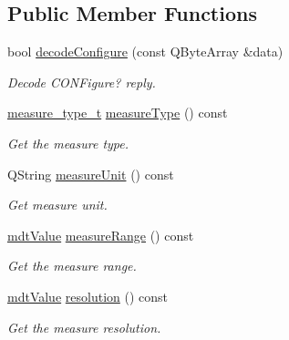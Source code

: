 \subsection*{Public Member Functions}
\begin{DoxyCompactItemize}
\item 
bool \hyperlink{classmdt_frame_codec_scpi_u3606_a_a178cc4f868b15b8c4591d8333afa84e4}{decodeConfigure} (const QByteArray \&data)
\begin{DoxyCompactList}\small\item\em Decode CONFigure? reply. \end{DoxyCompactList}\item 
\hypertarget{classmdt_frame_codec_scpi_u3606_a_a590c72641f56e0f0db6547244b3643ef}{
\hyperlink{classmdt_frame_codec_scpi_u3606_a_a3d7a1de14d77797a08e3d2991fa9f004}{measure\_\-type\_\-t} \hyperlink{classmdt_frame_codec_scpi_u3606_a_a590c72641f56e0f0db6547244b3643ef}{measureType} () const }
\label{classmdt_frame_codec_scpi_u3606_a_a590c72641f56e0f0db6547244b3643ef}

\begin{DoxyCompactList}\small\item\em Get the measure type. \end{DoxyCompactList}\item 
\hypertarget{classmdt_frame_codec_scpi_u3606_a_a866b905ad811baa00342d2a33174f69b}{
QString \hyperlink{classmdt_frame_codec_scpi_u3606_a_a866b905ad811baa00342d2a33174f69b}{measureUnit} () const }
\label{classmdt_frame_codec_scpi_u3606_a_a866b905ad811baa00342d2a33174f69b}

\begin{DoxyCompactList}\small\item\em Get measure unit. \end{DoxyCompactList}\item 
\hypertarget{classmdt_frame_codec_scpi_u3606_a_a068f91a459ddefa33e79ace763fc87fa}{
\hyperlink{classmdt_value}{mdtValue} \hyperlink{classmdt_frame_codec_scpi_u3606_a_a068f91a459ddefa33e79ace763fc87fa}{measureRange} () const }
\label{classmdt_frame_codec_scpi_u3606_a_a068f91a459ddefa33e79ace763fc87fa}

\begin{DoxyCompactList}\small\item\em Get the measure range. \end{DoxyCompactList}\item 
\hypertarget{classmdt_frame_codec_scpi_u3606_a_a4b2d46f6256bd804c85200a2bc1d4dda}{
\hyperlink{classmdt_value}{mdtValue} \hyperlink{classmdt_frame_codec_scpi_u3606_a_a4b2d46f6256bd804c85200a2bc1d4dda}{resolution} () const }
\label{classmdt_frame_codec_scpi_u3606_a_a4b2d46f6256bd804c85200a2bc1d4dda}

\begin{DoxyCompactList}\small\item\em Get the measure resolution. \end{DoxyCompactList}\end{DoxyCompactItemize}


